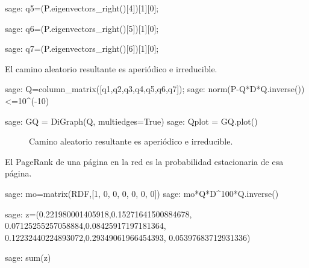 \begin{sagecommandline}
    sage: q5=(P.eigenvectors_right()[4])[1][0];
\end{sagecommandline}

\begin{sagecommandline}
    sage: q6=(P.eigenvectors_right()[5])[1][0];
\end{sagecommandline}

\begin{sagecommandline}
    sage: q7=(P.eigenvectors_right()[6])[1][0];
\end{sagecommandline}

\par El camino aleatorio resultante es aperiódico e irreducible.

\begin{sagecommandline}
    sage: Q=column_matrix([q1,q2,q3,q4,q5,q6,q7]);
    sage: norm(P-Q*D*Q.inverse())<=10^(-10)
\end{sagecommandline}
\begin{sagecommandline}
    sage: GQ = DiGraph(Q, multiedges=True)
    sage: Qplot = GQ.plot()
\end{sagecommandline}
\begin{figure}[H]
    \centering
    \label{caminoZ}
    \caption{Camino aleatorio resultante es aperiódico e irreducible.}
\end{figure}

\par El PageRank de una página en la red es la probabilidad estacionaria de esa página.
    
\begin{sagecommandline}
    sage: mo=matrix(RDF,[1, 0, 0, 0, 0, 0, 0])
    sage: mo*Q*D^100*Q.inverse()
\end{sagecommandline}

\begin{sagecommandline}
    sage: z=(0.221980001405918,0.15271641500884678, 0.07125255257058884,0.08425917197181364, 0.12232440224893072,0.29349061966454393, 0.05397683712931336)
\end{sagecommandline}

    
\begin{sagecommandline}
    sage: sum(z)
\end{sagecommandline}

